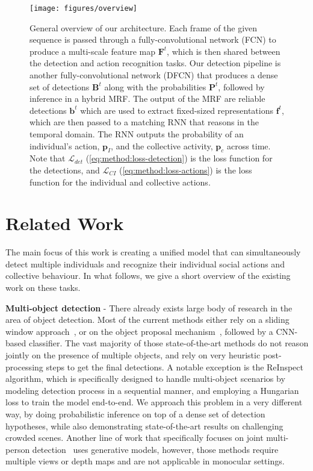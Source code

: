 \documentclass[10pt,twocolumn,letterpaper]{article}
\newcommand{\bF}[0]{\mathbf{F}}
\newcommand{\bP}[0]{\mathbf{P}}
\newcommand{\bB}[0]{\mathbf{B}}
\newcommand{\bb}[0]{\mathbf{b}}
\newcommand{\bp}[0]{\bm{p}}
\newcommand{\ff}[0]{\bm{f}}
\newcommand{\mL}[0]{\mathcal{L}}
\begin{document}
\begin{figure*}[htp!]
\vspace{-0.25cm}
\begin{center}
\texttt{[image: figures/overview]}
\end{center}
\vspace{-0.5cm}
\caption{General overview of our architecture. Each frame of the given 
sequence is passed through a fully-convolutional network (FCN) to produce a 
multi-scale feature map $\bF^t$, which is then shared between the detection and action 
recognition tasks. Our detection pipeline is another fully-convolutional network (DFCN) 
that produces a dense set of detections $\bB^t$ along with the probabilities 
$\bP^t$, followed by inference in a hybrid MRF. 
The output of the MRF are reliable detections $\bb^t$ which are used to extract
fixed-sized representations $\ff^t$, which are then passed to a matching RNN that reasons 
in the temporal domain. The RNN outputs the probability of an individual's action,
$\bp_I$, and the collective activity, $\bp_c$ across time. Note that $\mL_{det}$ 
(\ref{eq:method:loss-detection}) is the
loss function for the detections, and $\mL_{CI}$ (\ref{eq:method:loss-actions}) is the loss
function for the individual and collective actions.}
\label{fi:method:overview}
\vspace{-0.5cm}
\end{figure*} \vspace{-0.1cm}
\section{Related Work}
\vspace{-0.15cm}
\label{sec:related}
The main focus of this work is creating a unified model that can
simultaneously detect multiple individuals and recognize their
individual social actions and collective behaviour. 
In what follows, we give a short overview of the existing work on these tasks. 

\noindent \textbf{Multi-object detection} - There already exists large body of 
research in the area of object detection. Most of the current methods either 
rely on a sliding window approach~\cite{Sermanet2013,Zhang2015}, or on the object proposal
mechanism~\cite{Girshick2015,Ren2015}, followed by a CNN-based classifier. The
vast majority of those state-of-the-art methods do not reason jointly on the
presence of multiple objects, and rely on very heuristic post-processing
steps to get the final detections. A notable exception is the
ReInspect~\cite{Stewart2016} algorithm, which is specifically designed to handle
multi-object scenarios by modeling detection process in a sequential manner,
and employing a Hungarian loss to train the model end-to-end. We approach this
problem in a very different way, by doing probabilistic inference on top of 
a dense set of detection hypotheses, while also demonstrating state-of-the-art 
results on challenging crowded scenes. Another line of work that specifically 
focuses on joint multi-person detection~\cite{Fleuret2008, Bagautdinov2015} uses
generative models, however, those methods require multiple views or depth maps 
and are not applicable in monocular settings.
\end{document}
